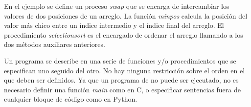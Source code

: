 \documentclass{article}
\begin{document}
En el ejemplo se define un proceso \textit{swap} que se encarga de intercambiar los valores de dos posiciones de un arreglo.
La función \textit{min\gbajo pos} calcula la posición del valor más chico entre un índice intermedio y el índice final del arreglo.
El procedimiento \textit{selection\gbajo sort} es el encargado de ordenar el arreglo llamando a los dos métodos auxiliares anteriores.

Un programa se describe en una serie de funciones y/o procedimientos que se especifican uno seguido del otro.
No hay ninguna restricción sobre el orden en el que deben ser definidos.
Ya que un programa de \Lang\space no puede ser ejecutado, no es necesario definir una función \textit{main} como en C, o especificar sentencias fuera de cualquier bloque de código como en Python.
\end{document}
